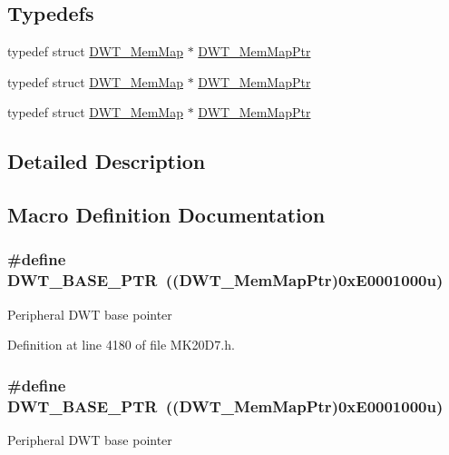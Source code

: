 \subsection*{Typedefs}
\begin{DoxyCompactItemize}
\item 
typedef struct \hyperlink{struct_d_w_t___mem_map}{D\+W\+T\+\_\+\+Mem\+Map} $\ast$ \hyperlink{group___d_w_t___peripheral_ga8a09a1b28d871c18ae8c69f67af6d573}{D\+W\+T\+\_\+\+Mem\+Map\+Ptr}
\item 
typedef struct \hyperlink{struct_d_w_t___mem_map}{D\+W\+T\+\_\+\+Mem\+Map} $\ast$ \hyperlink{group___d_w_t___peripheral_ga8a09a1b28d871c18ae8c69f67af6d573}{D\+W\+T\+\_\+\+Mem\+Map\+Ptr}
\item 
typedef struct \hyperlink{struct_d_w_t___mem_map}{D\+W\+T\+\_\+\+Mem\+Map} $\ast$ \hyperlink{group___d_w_t___peripheral_ga8a09a1b28d871c18ae8c69f67af6d573}{D\+W\+T\+\_\+\+Mem\+Map\+Ptr}
\end{DoxyCompactItemize}


\subsection{Detailed Description}


\subsection{Macro Definition Documentation}
\subsubsection[{\texorpdfstring{D\+W\+T\+\_\+\+B\+A\+S\+E\+\_\+\+P\+TR}{DWT_BASE_PTR}}]{\setlength{\rightskip}{0pt plus 5cm}\#define D\+W\+T\+\_\+\+B\+A\+S\+E\+\_\+\+P\+TR~(({\bf D\+W\+T\+\_\+\+Mem\+Map\+Ptr})0x\+E0001000u)}\hypertarget{group___d_w_t___peripheral_ga3b46dfb2ea7946c6938028d879c82cb1}{}\label{group___d_w_t___peripheral_ga3b46dfb2ea7946c6938028d879c82cb1}
Peripheral D\+WT base pointer 

Definition at line 4180 of file M\+K20\+D7.\+h.

\subsubsection[{\texorpdfstring{D\+W\+T\+\_\+\+B\+A\+S\+E\+\_\+\+P\+TR}{DWT_BASE_PTR}}]{\setlength{\rightskip}{0pt plus 5cm}\#define D\+W\+T\+\_\+\+B\+A\+S\+E\+\_\+\+P\+TR~(({\bf D\+W\+T\+\_\+\+Mem\+Map\+Ptr})0x\+E0001000u)}\hypertarget{group___d_w_t___peripheral_ga3b46dfb2ea7946c6938028d879c82cb1}{}\label{group___d_w_t___peripheral_ga3b46dfb2ea7946c6938028d879c82cb1}
Peripheral D\+WT base pointer 

